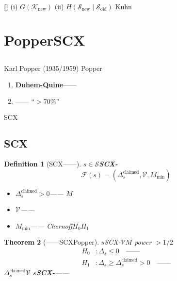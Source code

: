 \documentclass[11pt,a4paper]{article}
\newtheorem{theorem}{Theorem}[section]
\newtheorem{definition}[theorem]{Definition}
\theoremstyle{remark}
\newcommand{\honeststrike}{\textnormal{\textbf{[]}}}
\begin{document}
\honeststrike{} \textbf{}
\textbf{}\textbf{}
(i) $G(\mathcal{K}_{\text{new}})$\textbf{}
(ii) $H(\mathcal{S}_{\text{new}} \mid \mathcal{S}_{\text{old}})$
Kuhn
\textbf{}

\section{PopperSCX}

\subsection{}

Karl Popper (1935/1959)\textit{}
\textbf{}
Popper

\begin{enumerate}[label=(\arabic*)]
    \item \textbf{Duhem-Quine}——
          
    \item \textbf{}——
          ``$>70\%$''
\end{enumerate}

SCX\textbf{}

\subsection{SCX}

\begin{definition}[SCX——]
\label{def:falsifiability}
$s \in \mathcal{S}$\textbf{SCX-}
\begin{equation}
    \boxed{\mathcal{F}(s) = (\Delta_s^{\text{claimed}}, \mathcal{V}, M_{\text{min}})}
\end{equation}

\begin{itemize}
    \item $\Delta_s^{\text{claimed}} > 0$——
          $M$
          \textbf{}
    \item $\mathcal{V}$\textbf{}——
          
    \item $M_{\text{min}}$\textbf{}——
          Chernoff$H_0$$H_1$
\end{itemize}
\end{definition}

\begin{theorem}[——SCXPopper]
\label{thm:scx_popper}
$s$SCX-$\mathcal{V}$$M$
power $> 1/2$
\begin{align}
    H_0 &: \Delta_s \leq 0 \quad \text{——} \\
    H_1 &: \Delta_s \geq \Delta_s^{\text{claimed}} > 0 \quad \text{——} 
\end{align}
\textbf{}$\Delta_s^{\text{claimed}}$$\mathcal{V}$
$s$\textbf{SCX-}——
\end{theorem}
\end{document}
